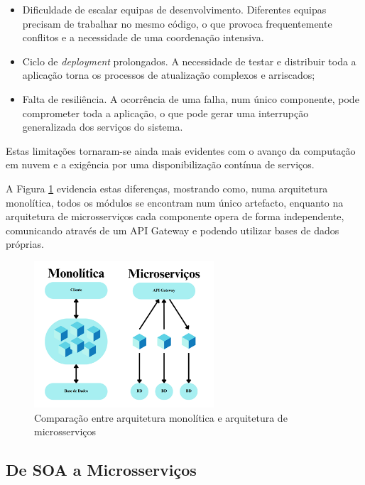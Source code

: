 \begin{itemize}
    \item Dificuldade de escalar equipas de desenvolvimento. Diferentes equipas precisam de trabalhar no mesmo código, o que provoca frequentemente conflitos e a necessidade de uma coordenação intensiva.
    \item Ciclo de \textit{deployment} prolongados. A necessidade de testar e distribuir toda a aplicação torna os processos de atualização complexos e arriscados;
    \item Falta de resiliência. A ocorrência de uma falha, num único componente, pode comprometer toda a aplicação, o que pode gerar uma interrupção generalizada dos serviços do sistema.
\end{itemize}

Estas limitações tornaram-se ainda mais evidentes com o avanço da computação em nuvem e a exigência por uma disponibilização contínua de serviços.

A Figura \ref{fig:monolitica_microservicos} evidencia estas diferenças, mostrando como, numa arquitetura monolítica, todos os módulos se encontram num único artefacto, enquanto na arquitetura de microsserviços cada componente opera de forma independente, comunicando através de um API Gateway e podendo utilizar bases de dados próprias.


\begin{figure}[h]
    \centering
    \includegraphics[width=0.6\textwidth]{images/Diagramas/monilitica_vs_microservicos.png}
    \caption{Comparação entre arquitetura monolítica e arquitetura de microsserviços}
    \label{fig:monolitica_microservicos}
\end{figure}

\clearpage

\subsection{De SOA a Microsserviços}


